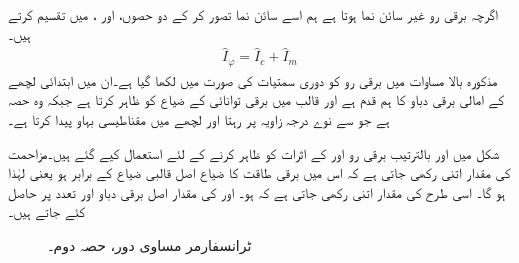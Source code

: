  اگرچہ برقی رو  غیر سائن نما ہوتا ہے ہم  اسے سائن نما   تصور  کر کے  دو حصوں،  اور ، میں تقسیم کرتے ہیں۔
\begin{align}\label{مساوات_ٹرانسفارمر_رو_ہیجان_ضیاع_اجزاع}
\hat{I}_\varphi=\hat{I}_c+\hat{I}_m
\end{align}
مذکورہ بالا مساوات میں برقی رو کو دوری سمتیات کی صورت میں لکھا گیا ہے۔ان میں   ابتدائی لچھے کے امالی برقی دباو  کا ہم قدم ہے اور  قالب میں برقی توانائی کے ضیاع کو ظاہر کرتا ہے جبکہ   وہ حصہ ہے جو  سے نوے درجہ   زاویہ  پر رہتا اور  لچھے میں مقناطیسی بہاو پیدا کرتا ہے۔

شکل  میں   اور   بالترتیب برقی رو  اور  کے اثرات کو ظاہر کرنے کے لئے استعمال کیے گئے ہیں۔مزاحمت  کی مقدار اتنی رکھی جاتی ہے کہ اس میں برقی طاقت کا ضیاع اصل قالبی ضیاع کے برابر ہو یعنی  لہٰذا   ہو گا۔ اسی طرح  کی مقدار اتنی رکھی جاتی ہے کہ  ہو۔  اور   کی مقدار اصل برقی دباو اور تعدد پر حاصل کئے جاتے ہیں۔ 

\begin{figure}
\centering
\caption{ٹرانسفارمر مساوی دور، حصہ دوم۔}
\label{شکل_ٹرانسفارمر_ماڈل_حصہ_دوم}
\end{figure}

